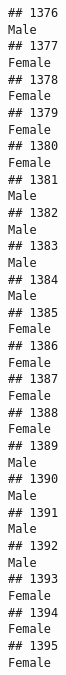 \documentclass[]{article}
\begin{document}
\begin{verbatim}
## 1376                                                                                                                            Male
## 1377                                                                                                                          Female
## 1378                                                                                                                          Female
## 1379                                                                                                                          Female
## 1380                                                                                                                          Female
## 1381                                                                                                                            Male
## 1382                                                                                                                            Male
## 1383                                                                                                                            Male
## 1384                                                                                                                            Male
## 1385                                                                                                                          Female
## 1386                                                                                                                          Female
## 1387                                                                                                                          Female
## 1388                                                                                                                          Female
## 1389                                                                                                                            Male
## 1390                                                                                                                            Male
## 1391                                                                                                                            Male
## 1392                                                                                                                            Male
## 1393                                                                                                                          Female
## 1394                                                                                                                          Female
## 1395                                                                                                                          Female

\end{verbatim}
\end{document}
